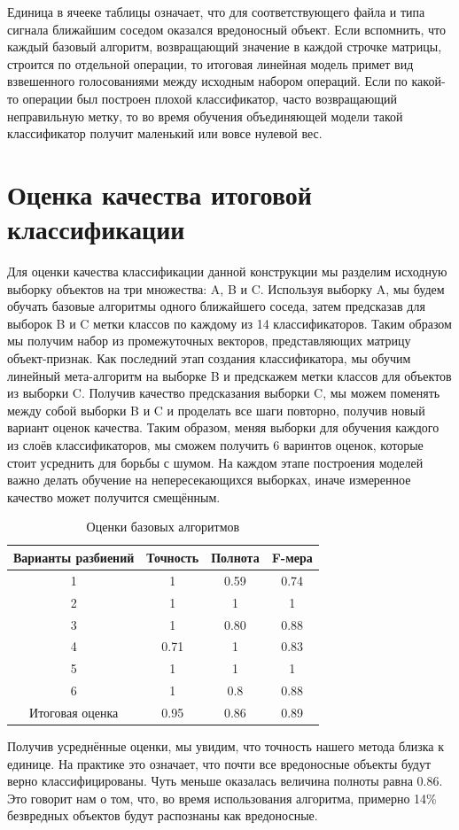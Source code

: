 Единица в ячееке таблицы означает, что для соответствующего файла и типа сигнала ближайшим соседом оказался вредоносный объект.
Если вспомнить, что каждый базовый алгоритм, возвращающий значение в каждой строчке матрицы, строится по отдельной операции, то итоговая линейная модель примет вид взвешенного голосованиями между исходным набором операций. Если по какой-то операции был построен плохой классификатор, часто возвращающий неправильную метку, то во время обучения объединяющей модели такой классификатор получит маленький или вовсе нулевой вес.

\section{Оценка качества итоговой классификации}

Для оценки качества классификации данной конструкции мы разделим исходную выборку объектов на три множества: A, B и C. Используя выборку A, мы будем обучать базовые алгоритмы одного ближайшего соседа, затем предсказав для выборок B и C метки классов по каждому из 14 классификаторов. Таким образом мы получим набор из промежуточных векторов, представляющих матрицу объект-признак. Как последний этап создания классификатора, мы обучим линейный мета-алгоритм на выборке B и предскажем метки классов для объектов из выборки C. Получив качество предсказания выборки C, мы можем поменять между собой выборки B и C и проделать все шаги повторно, получив новый вариант оценок качества. Таким образом, меняя выборки для обучения каждого из слоёв классификаторов, мы сможем получить 6 варинтов оценок, которые стоит усреднить для борьбы с шумом. На каждом этапе построения моделей важно делать обучение на непересекающихся выборках, иначе измеренное качество может получится смещённым.

\bgroup
\def\arraystretch{1.5}%
\begin{table}[ht]
\caption{Оценки базовых алгоритмов}
\label{tab_weight}
\centering
    \begin{tabular}{|c|c|c|c|}
	\hline Варианты разбиений & Точность & Полнота & F-мера \\
	\hline 1 & 1 & 0.59 & 0.74 \\
	\hline 2 & 1 & 1 & 1 \\
	\hline 3 & 1 & 0.80 & 0.88 \\
	\hline 4 & 0.71 & 1 & 0.83 \\
	\hline 5 & 1 & 1 & 1 \\
	\hline 6 & 1 & 0.8 & 0.88 \\
	\hline Итоговая оценка & 0.95 & 0.86 & 0.89 \\
	\hline
    \end{tabular}
\end{table}
\egroup

Получив усреднённые оценки, мы увидим, что точность нашего метода близка к единице. На практике это означает, что почти все вредоносные объекты будут верно классифицированы. Чуть меньше оказалась величина полноты равна 0.86. Это говорит нам о том, что, во время использования алгоритма, примерно 14\% безвредных объектов будут распознаны как вредоносные.
